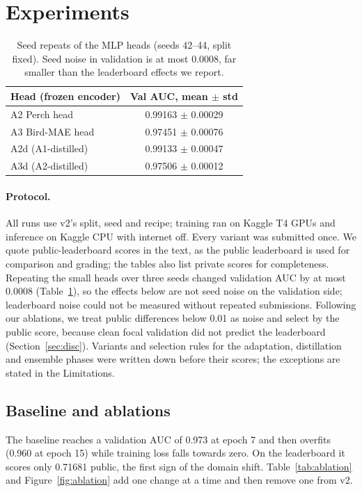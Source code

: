 \documentclass[letterpaper]{article} %
\begin{document}
\section{Experiments}
\begin{table}[t]
\centering
\small
\begin{tabular}{lc}
\toprule
Head (frozen encoder) & Val AUC, mean $\pm$ std \\
\midrule
A2 Perch head & 0.99163 $\pm$ 0.00029 \\
A3 Bird-MAE head & 0.97451 $\pm$ 0.00076 \\
A2d (A1-distilled) & 0.99133 $\pm$ 0.00047 \\
A3d (A2-distilled) & 0.97506 $\pm$ 0.00012 \\
\bottomrule
\end{tabular}
\caption{Seed repeats of the MLP heads (seeds 42--44, split fixed). Seed noise in validation is at most 0.0008, far smaller than the leaderboard effects we report.}
\label{tab:seed}
\end{table}

\paragraph{Protocol.} All runs use v2's split, seed and recipe; training ran on Kaggle T4 GPUs and inference on Kaggle CPU with internet off. Every variant was submitted once. We quote public-leaderboard scores in the text, as the public leaderboard is used for comparison and grading; the tables also list private scores for completeness. Repeating the small heads over three seeds changed validation AUC by at most 0.0008 (Table~\ref{tab:seed}), so the effects below are not seed noise on the validation side; leaderboard noise could not be measured without repeated submissions. Following our ablations, we treat public differences below 0.01 as noise and select by the public score, because clean focal validation did not predict the leaderboard (Section~\ref{sec:disc}). Variants and selection rules for the adaptation, distillation and ensemble phases were written down before their scores; the exceptions are stated in the Limitations.

\subsection{Baseline and ablations}
The baseline reaches a validation AUC of 0.973 at epoch 7 and then overfits (0.960 at epoch 15) while training loss falls towards zero. On the leaderboard it scores only 0.71681 public, the first sign of the domain shift. Table~\ref{tab:ablation} and Figure~\ref{fig:ablation} add one change at a time and then remove one from v2.
\end{document}
